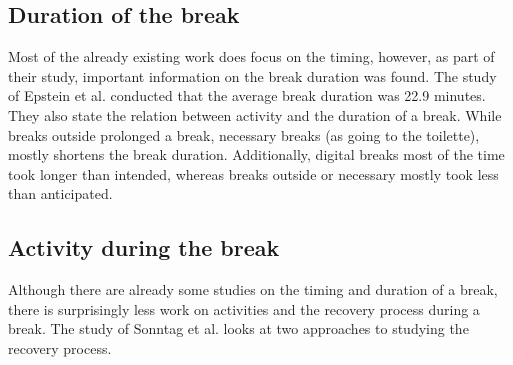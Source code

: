 \documentclass{hasel_thesis}
\begin{document}
\subsection{Duration of the break}

Most of the already existing work does focus on the timing, however, as part of their study, important information on the break duration was found. The study of Epstein et al. \cite{epstein.2016t} conducted that the average break duration was 22.9 minutes. They also state the relation between activity and the duration of a break. While breaks outside prolonged a break, necessary breaks (as going to the toilette), mostly shortens the break duration. Additionally, digital breaks most of the time took longer than intended, whereas breaks outside or necessary mostly took less than anticipated.

\subsection{Activity during the break} \label{rw_activity}

Although there are already some studies on the timing and duration of a break, there is surprisingly less work on activities and the recovery process during a break. The study of Sonntag et al. \cite{Sonnentag.2022} looks at two approaches to studying the recovery process.
\end{document}
